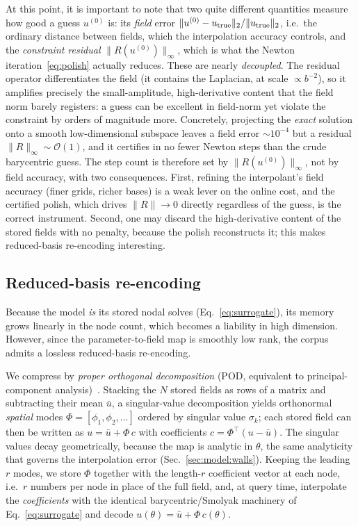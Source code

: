\documentclass[
  aps,
  prd,
  twocolumn,
  amsmath,
  amssymb,
  nofootinbib,
  superscriptaddress,
  floatfix,
]{revtex4-2}
\begin{document}
At this point, it is important to note that two quite different quantities measure how good a guess
$u^{(0)}$ is: its \emph{field} error $\|u^{(0)}-u_{\rm true}\|_2/\|u_{\rm true}\|_2$, i.e.\ the ordinary distance between fields, which the interpolation accuracy controls, and the \emph{constraint residual}
$\|R(u^{(0)})\|_\infty$, which is what the Newton iteration~\eqref{eq:polish}
actually reduces. These are nearly \emph{decoupled}. The residual operator
differentiates the field (it contains the Laplacian, at scale $\propto b^{-2}$),
so it amplifies precisely the small-amplitude, high-derivative content that the
field norm barely registers: a guess can be excellent in field-norm yet violate the
constraint by orders of magnitude more. Concretely, projecting the \emph{exact}
solution onto a smooth low-dimensional subspace leaves a field error
$\sim\!10^{-4}$ but a residual $\|R\|_\infty\sim\mathcal{O}(1)$, and it certifies
in no fewer Newton steps than the crude barycentric guess. The step count is
therefore set by $\|R(u^{(0)})\|_\infty$, not by field accuracy, with two
consequences. First, refining the interpolant's field accuracy (finer grids,
richer bases) is a weak lever on the online cost, and the certified polish,
which drives $\|R\|\to0$ directly regardless of the guess, is the correct
instrument. Second, one may discard the high-derivative content of
the stored fields with no penalty, because the polish reconstructs it; this makes reduced-basis re-encoding interesting.

\subsection{Reduced-basis re-encoding}
\label{sec:param:pod}
Because the model \emph{is} its stored nodal solves (Eq.~\ref{eq:surrogate}), its
memory grows linearly in the node count, which becomes a liability in
high dimension. However, since the parameter-to-field map is smoothly low
rank, the corpus admits a lossless reduced-basis re-encoding.

We compress by \emph{proper orthogonal decomposition} (POD, equivalent to
principal-component analysis)~\cite{Sirovich1987,BerkoozHolmesLumley1993}. Stacking
the $N$ stored fields as rows of a matrix and subtracting their mean $\bar u$, a
singular-value decomposition yields orthonormal \emph{spatial} modes
$\Phi=[\phi_1,\phi_2,\dots]$ ordered by singular value $\sigma_k$; each stored field
can then be written as $u=\bar u+\Phi\,c$ with coefficients $c=\Phi^{\!\top}(u-\bar u)$. The
singular values decay geometrically, because the map is analytic in $\theta$, the
same analyticity that governs the interpolation error (Sec.~\ref{sec:model:walls}).
Keeping the leading $r$ modes, we store $\Phi$ together with the length-$r$
coefficient vector at each node, i.e.\ $r$ numbers per node in place of the full field, and, at query time, interpolate the \emph{coefficients} with the identical
barycentric/Smolyak machinery of Eq.~\eqref{eq:surrogate} and decode
$u(\theta)=\bar u+\Phi\,c(\theta)$.
\end{document}
